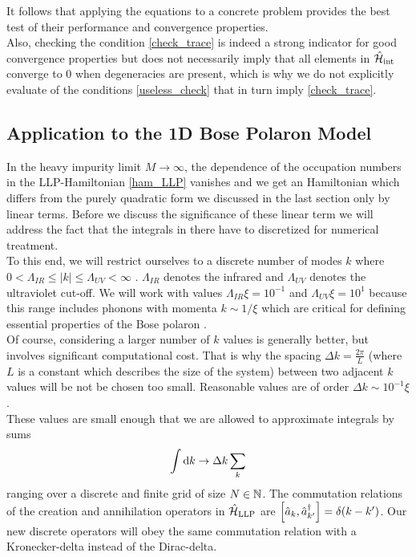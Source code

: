 It follows that applying the equations to a concrete problem provides the best test of their performance and convergence properties.\\
Also, checking the condition \ref{check_trace} is indeed a strong indicator for good convergence properties but does not necessarily imply that all elements in $\hat{\mathcal{H}}_{\mathrm{int}}$ converge to 0 when degeneracies are present, which is why we do not explicitly evaluate of the conditions \ref{useless_check} that in turn imply \ref{check_trace}.
\subsection{Application to the 1D Bose Polaron Model}
In the heavy impurity limit $M\rightarrow \infty$, the dependence of the occupation numbers in the LLP-Hamiltonian \ref{ham_LLP} vanishes and we get an Hamiltonian which differs from the purely quadratic form we discussed in the last section only by linear terms. Before we discuss the significance of these linear term we will address the fact that the integrals in there have to discretized for numerical treatment.\\
To this end, we will restrict ourselves to a discrete number of modes $k$ where $0<\Lambda_{IR}\leq |k|\leq\Lambda_{UV}<\infty$ . $\Lambda_{IR}$ denotes the infrared and $\Lambda_{UV}$ denotes the ultraviolet cut-off. We will work with values $\Lambda_{IR}\xi= 10^{-1}$ and $\Lambda_{UV}\xi= 10^1$ because this range includes phonons with momenta $k\sim1/\xi$ which are critical for defining essential properties of the Bose polaron \cite{Grusdt_2017}. \\
Of course, considering a larger number of $k$ values is generally better, but involves significant computational cost. That is why the spacing $\Delta k=\frac{2\pi}{L}$ (where $L$ is a constant which describes the size of the system) between two adjacent $k$ values will be not be chosen too small. Reasonable values are of order $\Delta k\sim 10^{-1}\xi$.  \\
These values are small enough that we are allowed to approximate integrals by sums
\begin{equation}
\int\mathrm d k\rightarrow \Delta k\sum\limits_k
\end{equation}
ranging over a discrete and finite grid of size $N\in\mathbb{N}$.
The commutation relations of the creation and annihilation operators in $\hat{\mathcal{H}}_{\mathrm{LLP}}$ are $\left[\hat a_k,\hat a^\dagger_{k^\prime}\right]=\delta(k-k^\prime)$. Our new discrete operators will obey the same commutation relation with a Kronecker-delta instead of the Dirac-delta.
